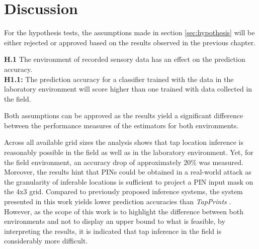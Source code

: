 \chapter{Discussion}
For the hypothesis tests, the assumptions made in section \ref{sec:hypothesis} will be either rejected or approved based on the results observed in the previous chapter.

\begin{center}
  \begin{framed}
    \textbf{H.1}  The environment of recorded sensory data has an effect on the prediction accuracy.\\
    \textbf{H1.1:} The prediction accuracy for a classifier trained with the data in the laboratory environment will score higher than one trained with data collected in the field.
  \end{framed}
\end{center}

Both assumptions can be approved as the results yield a significant difference between the performance measures of the estimators for both environments. 

Across all available grid sizes the analysis shows that tap location inference is reasonably possible in the field as well as in the laboratory environment. Yet, for the field environment, an accuracy drop of approximately 20\% was measured. Moreover, the results hint that PINs could be obtained in a real-world attack as the granularity of inferable locations is sufficient to project a PIN input mask on the 4x3 grid. Compared to previously proposed inference systems, the system presented in this work yields lower prediction accuracies than \textit{TapPrints} \cite{Tapprints}. However, as the scope of this work is to highlight the difference between both environments and not to display an upper bound to what is feasible, by interpreting the results, it is indicated that tap inference in the field is considerably more difficult.

